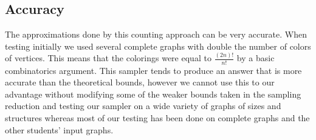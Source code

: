 \documentclass[14]{article}
\begin{document}
\subsection{Accuracy}
The approximations done by this counting approach can be very accurate. When testing initially we used several complete graphs with double the number of colors of vertices. This means that the colorings were equal to $\frac{(2n)!}{n!}$ by a basic combinatorics argument. This sampler tends to produce an answer that is more accurate than the theoretical bounds, however we cannot use this to our advantage without modifying some of the weaker bounds taken in the sampling reduction and testing our sampler on a wide variety of graphs of sizes and structures whereas most of our testing has been done on complete graphs and the other students' input graphs.
\end{document}
